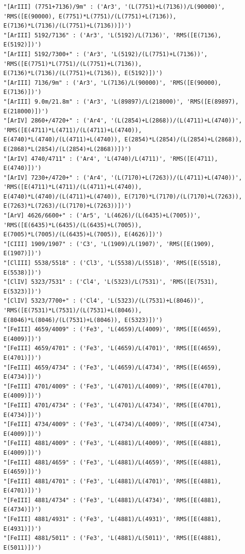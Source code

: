 \documentclass[11pt]{article}
\begin{document}
    \begin{Verbatim}[commandchars=\\\{\}]
"[ArIII] (7751+7136)/9m" : ('Ar3', '(L(7751)+L(7136))/L(90000)', 'RMS([E(90000), E(7751)*L(7751)/(L(7751)+L(7136)), E(7136)*L(7136)/(L(7751)+L(7136))])')
"[ArIII] 5192/7136" : ('Ar3', 'L(5192)/L(7136)', 'RMS([E(7136), E(5192)])')
"[ArIII] 5192/7300+" : ('Ar3', 'L(5192)/(L(7751)+L(7136))', 'RMS([E(7751)*L(7751)/(L(7751)+L(7136)), E(7136)*L(7136)/(L(7751)+L(7136)), E(5192)])')
"[ArIII] 7136/9m" : ('Ar3', 'L(7136)/L(90000)', 'RMS([E(90000), E(7136)])')
"[ArIII] 9.0m/21.8m" : ('Ar3', 'L(89897)/L(218000)', 'RMS([E(89897), E(218000)])')
"[ArIV] 2860+/4720+" : ('Ar4', '(L(2854)+L(2868))/(L(4711)+L(4740))', 'RMS([E(4711)*L(4711)/(L(4711)+L(4740)), E(4740)*L(4740)/(L(4711)+L(4740)), E(2854)*L(2854)/(L(2854)+L(2868)), E(2868)*L(2854)/(L(2854)+L(2868))])')
"[ArIV] 4740/4711" : ('Ar4', 'L(4740)/L(4711)', 'RMS([E(4711), E(4740)])')
"[ArIV] 7230+/4720+" : ('Ar4', '(L(7170)+L(7263))/(L(4711)+L(4740))', 'RMS([E(4711)*L(4711)/(L(4711)+L(4740)), E(4740)*L(4740)/(L(4711)+L(4740)), E(7170)*L(7170)/(L(7170)+L(7263)), E(7263)*L(7263)/(L(7170)+L(7263))])')
"[ArV] 4626/6600+" : ('Ar5', 'L(4626)/(L(6435)+L(7005))', 'RMS([E(6435)*L(6435)/(L(6435)+L(7005)), E(7005)*L(7005)/(L(6435)+L(7005)), E(4626)])')
"[CIII] 1909/1907" : ('C3', 'L(1909)/L(1907)', 'RMS([E(1909), E(1907)])')
"[ClIII] 5538/5518" : ('Cl3', 'L(5538)/L(5518)', 'RMS([E(5518), E(5538)])')
"[ClIV] 5323/7531" : ('Cl4', 'L(5323)/L(7531)', 'RMS([E(7531), E(5323)])')
"[ClIV] 5323/7700+" : ('Cl4', 'L(5323)/(L(7531)+L(8046))', 'RMS([E(7531)*L(7531)/(L(7531)+L(8046)), E(8046)*L(8046)/(L(7531)+L(8046)), E(5323)])')
"[FeIII] 4659/4009" : ('Fe3', 'L(4659)/L(4009)', 'RMS([E(4659), E(4009)])')
"[FeIII] 4659/4701" : ('Fe3', 'L(4659)/L(4701)', 'RMS([E(4659), E(4701)])')
"[FeIII] 4659/4734" : ('Fe3', 'L(4659)/L(4734)', 'RMS([E(4659), E(4734)])')
"[FeIII] 4701/4009" : ('Fe3', 'L(4701)/L(4009)', 'RMS([E(4701), E(4009)])')
"[FeIII] 4701/4734" : ('Fe3', 'L(4701)/L(4734)', 'RMS([E(4701), E(4734)])')
"[FeIII] 4734/4009" : ('Fe3', 'L(4734)/L(4009)', 'RMS([E(4734), E(4009)])')
"[FeIII] 4881/4009" : ('Fe3', 'L(4881)/L(4009)', 'RMS([E(4881), E(4009)])')
"[FeIII] 4881/4659" : ('Fe3', 'L(4881)/L(4659)', 'RMS([E(4881), E(4659)])')
"[FeIII] 4881/4701" : ('Fe3', 'L(4881)/L(4701)', 'RMS([E(4881), E(4701)])')
"[FeIII] 4881/4734" : ('Fe3', 'L(4881)/L(4734)', 'RMS([E(4881), E(4734)])')
"[FeIII] 4881/4931" : ('Fe3', 'L(4881)/L(4931)', 'RMS([E(4881), E(4931)])')
"[FeIII] 4881/5011" : ('Fe3', 'L(4881)/L(5011)', 'RMS([E(4881), E(5011)])')

\end{Verbatim}
\end{document}
